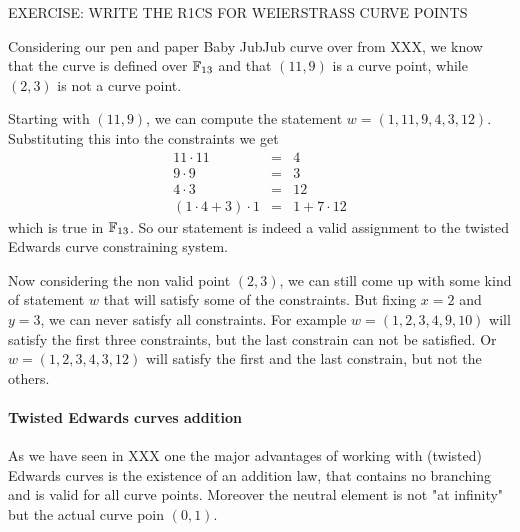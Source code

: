 \endgroup
EXERCISE: WRITE THE R1CS FOR WEIERSTRASS CURVE POINTS 
\begin{example}
Considering our pen and paper Baby JubJub curve over from XXX, we know that the curve is defined over $\mathbb{F}_{13}$ and that $(11,9)$ is a curve point, while $(2,3)$ is not a curve point. 

Starting with $(11,9)$, we can compute the statement $w=(1,11,9,4,3,12)$. Substituting this into the constraints we get
$$
\begin{array}{lcr}
11 \cdot 11 &=& 4\\
9 \cdot 9 &=& 3\\
4 \cdot 3 &=& 12\\
(1\cdot 4+3)\cdot 1 &=& 1+7\cdot 12
\end{array}
$$
which is true in $\mathbb{F}_{13}$. So our statement is indeed a valid assignment to the twisted Edwards curve constraining system.

Now considering the non valid point $(2,3)$, we can still come up with some kind of statement $w$ that will satisfy some of the constraints. But fixing $x=2$ and $y=3$, we can never satisfy all constraints. For example $w=(1,2,3,4,9,10)$ will satisfy the first three constraints, but the last constrain can not be satisfied. Or $w=(1,2,3,4,3,12)$ will satisfy the first and the last constrain, but not the others.
\end{example}
\paragraph{Twisted Edwards curves addition} As we have seen in XXX one the major advantages of working with (twisted) Edwards curves is the existence of an addition law, that contains no branching and is valid for all curve points. Moreover the neutral element is not "at infinity" but the actual curve poin $(0,1)$.

